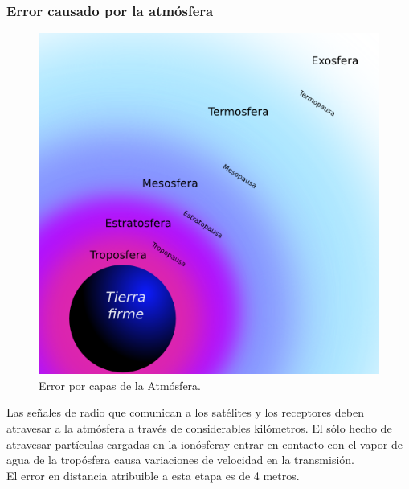 \subsubsection{Error causado por la atmósfera}

\begin{figure}[!ht]
\centering
\includegraphics[scale=0.48]{Figures/CapasAtm}
\caption[Error por capas de la Atmósfera.]{Error por capas de la Atmósfera\footnotemark.}
\label{fig:ErrAtm}
\end{figure}


Las señales de radio que comunican a los satélites y los receptores deben atravesar a la atmósfera a través de considerables kilómetros. El sólo hecho de atravesar partículas cargadas en la ionósfera\footnotemark y entrar en contacto con el vapor de agua de la tropósfera causa variaciones de velocidad en la transmisión. \\

El error en distancia atribuible a esta etapa es de 4 metros. 


